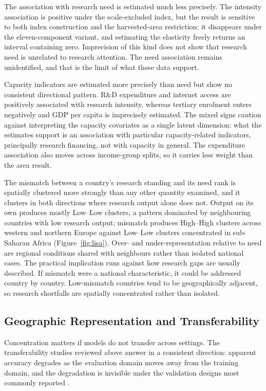 \documentclass[ASNA,twocolumn]{USG}
\begin{document}
The association with research need is estimated much less precisely. The intensity association
is positive under the scale-excluded index, but the result is sensitive to both index
construction and the harvested-area restriction: it disappears under the eleven-component
variant, and estimating the elasticity freely returns an interval containing zero. Imprecision of
this kind does not show that research need is unrelated to research attention. The need
association remains unidentified, and that is the limit of what these data support.

Capacity indicators are estimated more precisely than need but show no consistent directional
pattern. R\&D
expenditure and internet access are positively associated with research intensity, whereas
tertiary enrolment enters negatively and GDP per capita is imprecisely estimated. The mixed
signs caution against interpreting the capacity covariates as a single latent dimension: what
the estimates support is an association with particular capacity-related indicators,
principally research financing, not with capacity in general. The expenditure association also moves across income-group splits, so it carries less weight
than the area result.

The mismatch between a country's research standing and its need rank is spatially clustered
more strongly than any other quantity examined, and it clusters in both directions where
research output alone does not. Output on its own produces mostly Low--Low clusters, a pattern dominated by neighbouring
countries with low research output; mismatch produces High--High clusters across western and
northern Europe against Low--Low clusters concentrated in sub-Saharan Africa
(Figure~\ref{fig:lisa}).
Over- and under-representation relative to need are regional conditions shared with neighbours
rather than isolated national cases. The practical implication runs against how research gaps are usually described. If mismatch were a
national characteristic, it could be addressed country by country. Low-mismatch countries tend to be
geographically adjacent, so research shortfalls are spatially concentrated rather than isolated.

\subsection{Geographic Representation and Transferability}

Concentration matters if models do not transfer across settings. The transferability studies reviewed above answer in a consistent direction:
apparent accuracy degrades as the evaluation domain moves away from the training domain, and
the degradation is invisible under the validation designs most commonly reported
\cite{Habibi2024,Okupska2026,Stiller2024}.
\end{document}
